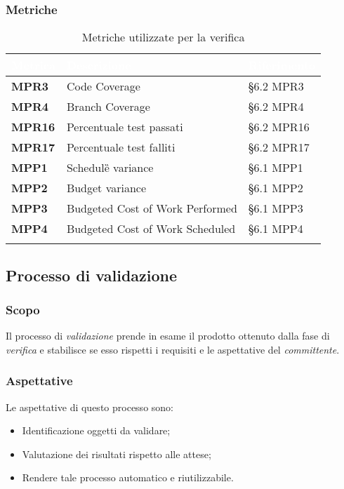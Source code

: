 								
				\subsubsection{Metriche}
					\setlength{\freewidth}{\dimexpr\textwidth-0\tabcolsep}
					\renewcommand{\arraystretch}{1.5}
					\setlength{\aboverulesep}{0pt}
					\setlength{\belowrulesep}{0pt}
					\begin{longtable}{L{.22\freewidth} L{.4\freewidth} L{.2\freewidth}}
						\toprule
						\textcolor{white}{\textbf{Metrica}}&
						\textcolor{white}{\textbf{Descrizione}}&	
						\textcolor{white}{\textbf{Riferimento}}\\
						\toprule
						\endhead
						
						\textbf{MPR3} & Code Coverage & \S 6.2 MPR3 \\
						\textbf{MPR4} & Branch Coverage & \S 6.2 MPR4 \\
						\textbf{MPR16} & Percentuale test passati & \S 6.2 MPR16 \\
						\textbf{MPR17} & Percentuale test falliti & \S 6.2 MPR17 \\
						\textbf{MPP1} & Schedule\G{} variance & \S 6.1 MPP1 \\
						\textbf{MPP2} & Budget variance & \S 6.1 MPP2 \\
						\textbf{MPP3} & Budgeted Cost of Work Performed & \S 6.1 MPP3 \\
						\textbf{MPP4} & Budgeted Cost of Work Scheduled & \S 6.1 MPP4 \\

						\bottomrule
						\caption*{Metriche utilizzate per la verifica}
					\end{longtable}
			
		\subsection{Processo di validazione}
			\subsubsection{Scopo}
				Il processo di \emph{validazione} prende in esame il prodotto ottenuto dalla fase di \emph{verifica} e stabilisce se esso rispetti i requisiti e le aspettative del \emph{committente}.
			\subsubsection{Aspettative}
				Le aspettative di questo processo sono:
					\begin{itemize}
						\item Identificazione oggetti da validare;
						\item Valutazione dei risultati rispetto alle attese;
						\item Rendere tale processo automatico e riutilizzabile.
					\end{itemize}
